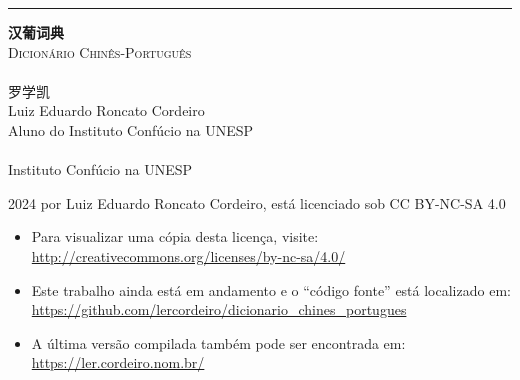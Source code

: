\begin{titlingpage}
  \raggedleft
  \rule{1pt}{\textheight}
  \hspace{0.1\textwidth}
  \parbox[b]{0.75\textwidth}{
    \vspace{0.05\textheight}
    {\HUGE\bfseries 汉葡词典}\\[2\baselineskip] %
    {\Large\textsc{Dicionário Chinês-Português}\\%
     \large\textsc{\zhtoday}}\\%
    [4\baselineskip]
    {\Large\textsc{罗学凯}\\%
     \small Luiz Eduardo Roncato Cordeiro\\%
            Aluno do Instituto Confúcio na UNESP}\\%
    \vspace{0.5\textheight}\\%
    {Instituto Confúcio na UNESP}\\[\baselineskip] %
  }
  \newpage
  \raggedright
  \setlength{\parindent}{0pt}
  \setlength{\parskip}{\baselineskip}
  \mbox{}
  \vfill
  \footnotesize
  \textcopyright{} 2024 por Luiz Eduardo Roncato Cordeiro, está licenciado sob CC BY-NC-SA 4.0\\
  \begin{itemize}
    \item Para visualizar uma cópia desta licença, visite:\\ \url{http://creativecommons.org/licenses/by-nc-sa/4.0/}
    \item Este trabalho ainda está em andamento e o ``código fonte'' está localizado em:\\ \url{https://github.com/lercordeiro/dicionario_chines_portugues}
    \item A última versão compilada também pode ser encontrada em:\\ \url{https://ler.cordeiro.nom.br/}
  \end{itemize}
\end{titlingpage}
